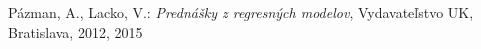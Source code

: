 \begin{thebibliography}{99}

	 Pázman, A., Lacko, V.: {\it Prednášky z regresných modelov}, Vydavateľstvo UK, Bratislava, 2012, 2015

\end{thebibliography}
